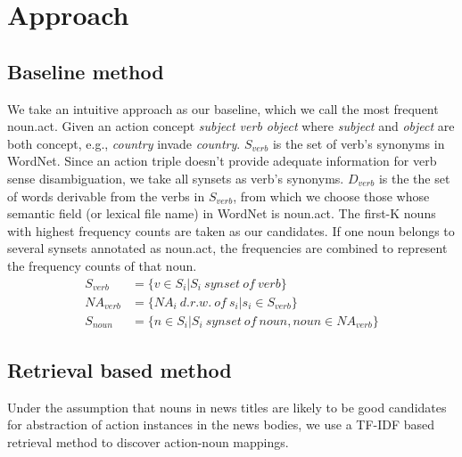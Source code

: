 \section{Approach}

\subsection{Baseline method}
We take an intuitive approach as our baseline, which we call the 
most frequent noun.act.
Given an action concept \emph{subject verb object} where \emph{subject} 
and \emph{object} are both concept, e.g., \emph{country} invade \emph{country}.
$S_{verb}$ is the set of verb's synonyms in WordNet. 
Since an action triple doesn't provide adequate information for verb sense 
disambiguation, we take all synsets as verb's synonyms. $D_{verb}$ is 
the the set of words derivable from the verbs in $S_{verb}$,
from which we choose those whose semantic field (or lexical file name) 
in WordNet is noun.act.  The first-K nouns with highest frequency
 counts are taken as our candidates. If one noun belongs to several 
synsets annotated as noun.act, the frequencies are combined to represent
the frequency counts of that noun.
\begin{align}
    S_{verb} & = \{{ v \in S_i | S_i \ synset \ of \ verb}\} \\
    NA_{verb} & = \{{ NA_i \ d.r.w.  \ of \ s_i | s_i \in S_{verb}}\} \\
    S_{noun} & = \{{ n \in S_i | S_i \ synset \ of \ noun, noun \in NA_{verb}}\}
\end{align}


\subsection{Retrieval based method}

Under the assumption that nouns in news titles are likely to be good candidates
for abstraction of action instances in the news bodies, we use a TF-IDF 
based retrieval method to discover action-noun mappings.

